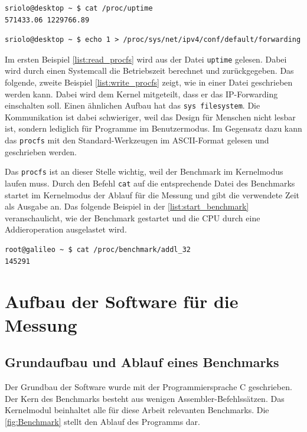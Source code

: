 \lstset{language=bash}
\begin{minipage}{\linewidth}
\begin{lstlisting}[label={list:read_procfs},caption={Lesen im procfs}]
sriolo@desktop ~ $ cat /proc/uptime 
571433.06 1229766.89
\end{lstlisting}
\begin{lstlisting}[label={list:write_procfs},caption={Schreiben im procfs}]
sriolo@desktop ~ $ echo 1 > /proc/sys/net/ipv4/conf/default/forwarding
\end{lstlisting}
\end{minipage}


Im ersten Beispiel \autoref{list:read_procfs} wird aus der Datei \texttt{uptime} gelesen. Dabei wird durch einen Systemcall die Betriebszeit berechnet und zurückgegeben. Das folgende, zweite Beispiel \autoref{list:write_procfs} zeigt, wie in einer Datei geschrieben werden kann. Dabei wird dem Kernel mitgeteilt, dass er das IP-Forwarding einschalten soll. Einen ähnlichen Aufbau hat das \texttt{sys filesystem}. Die Kommunikation ist dabei schwieriger, weil das Design für Menschen nicht lesbar ist, sondern lediglich für Programme im Benutzermodus. Im Gegensatz dazu kann das \texttt{procfs} mit den Standard-Werkzeugen im ASCII-Format gelesen und geschrieben werden.
\par
Das \texttt{procfs} ist an dieser Stelle wichtig, weil der Benchmark im Kernelmodus laufen muss. Durch den Befehl \texttt{cat} auf die entsprechende Datei des Benchmarks startet im Kernelmodus der Ablauf für die Messung und gibt die verwendete Zeit als Ausgabe an. Das folgende Beispiel in der \autoref{list:start_benchmark} veranschaulicht, wie der Benchmark gestartet und die CPU durch eine Addieroperation ausgelastet wird.

\lstset{language=bash}
\begin{minipage}{\linewidth}
\begin{lstlisting}[label={list:start_benchmark},caption={Starten des Benchmarks}]
root@galileo ~ $ cat /proc/benchmark/addl_32
145291
\end{lstlisting}
\end{minipage}

\pagebreak
\section{Aufbau der Software für die Messung}


\subsection{Grundaufbau und Ablauf eines Benchmarks}
Der Grundbau der Software wurde mit der Programmiersprache C geschrieben. Der Kern des Benchmarks besteht aus wenigen Assembler-Befehlssätzen. Das Kernelmodul beinhaltet alle für diese Arbeit relevanten Benchmarks. Die \autoref{fig:Benchmark} stellt den Ablauf des Programms dar.

